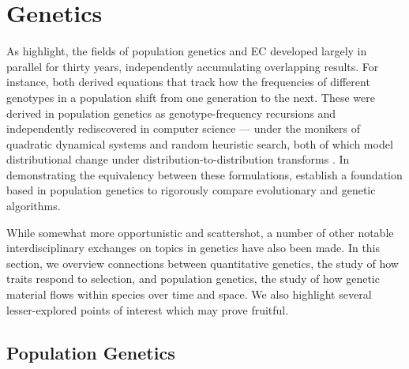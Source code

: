 \section{Genetics} %
\label{sec:genetics}

As \citet{paixao2015toward} highlight, the fields of population genetics and EC developed largely in parallel for thirty years, independently accumulating overlapping results.  %
For instance, both derived equations that track how the frequencies of different genotypes in a population shift from one generation to the next.
These were derived in population genetics as genotype-frequency recursions \citep{lewontin1964interaction,slatkin1970selection} and independently rediscovered in computer science --- under the monikers of quadratic dynamical systems and random heuristic search, both of which model distributional change under distribution-to-distribution transforms \citep{rabinovich1992quadratic,rabani1998computational,vose1999random}.
In demonstrating the equivalency between these formulations, \citet{paixao2015toward} establish a foundation based in population genetics to rigorously compare evolutionary and genetic algorithms. %

While somewhat more opportunistic and scattershot, a number of other notable interdisciplinary exchanges on topics in genetics have also been made.
In this section, we overview connections between quantitative genetics, the study of how traits respond to selection, and population genetics, the study of how genetic material flows within species over time and space.
We also highlight several lesser-explored points of interest which may prove fruitful.

\subsection{Population Genetics}
\label{sec:population-genetics}

